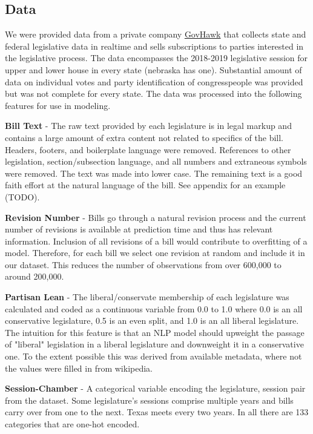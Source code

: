 \documentclass[11pt]{article}
\begin{document}
\subsection{Data}

We were provided data from a private company \href{https://govhawk.com/}{GovHawk} that collects state and federal legislative data in realtime and 
sells subscriptions to parties interested in the legislative process. The data encompasses the 2018-2019 legislative session for upper and lower house in
every state (nebraska has one). Substantial amount of data on individual votes and party identification of congresspeople was provided but was not complete for
every state. The data was processed into the following features for use in modeling.

\textbf{Bill Text} - The raw text provided by each legislature is in legal markup and contains a large amount of extra content not related to specifics of the bill. 
Headers, footers, and boilerplate language were removed. References to other legislation, section/subsection language, and all numbers and extraneous symbols were removed.
The text was made into lower case. The remaining text is a good faith effort at the natural language of the bill. See appendix for an example (TODO).

\textbf{Revision Number} - Bills go through a natural revision process and the current number of revisions is available at prediction time and thus has relevant information. 
Inclusion of all revisions of a bill would contribute to overfitting of a model. Therefore, for each bill we select one revision at random and include it in our dataset.
This reduces the number of observations from over 600,000 to around 200,000.

\textbf{Partisan Lean} - The liberal/conservate membership of each legislature was calculated and coded as a continuous variable from 0.0 to 1.0
 where 0.0 is an all conservative legislature, 0.5 is an even split, and 1.0 is an all liberal legislature. The intuition for this feature is that an 
 NLP model should upweight the passage of "liberal" legislation in a liberal legislature and downweight it in a conservative one. To the extent possible this was
 derived from available metadata, where not the values were filled in from wikipedia.

\textbf{Session-Chamber} - A categorical variable encoding the legislature, session pair from the dataset. Some legislature's sessions comprise multiple years and bills
carry over from one to the next. Texas meets every two years. In all there are 133 categories that are one-hot encoded.
\end{document}
